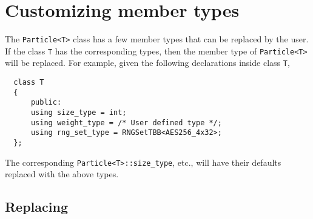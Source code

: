 \section{Customizing member types}
\label{sec:Customizing member types}

The \verb|Particle<T>| class has a few member types that can be replaced by the
user. If the class \verb|T| has the corresponding types, then the member type
of \verb|Particle<T>| will be replaced. For example, given the following
declarations inside class \verb|T|,
\begin{Verbatim}
  class T
  {
      public:
      using size_type = int;
      using weight_type = /* User defined type */;
      using rng_set_type = RNGSetTBB<AES256_4x32>;
  };
\end{Verbatim}
The corresponding \verb|Particle<T>::size_type|, etc., will have their defaults
replaced with the above types.

\subsection{Replacing \protect\wtype}
\label{sub:Replacing wtype}

